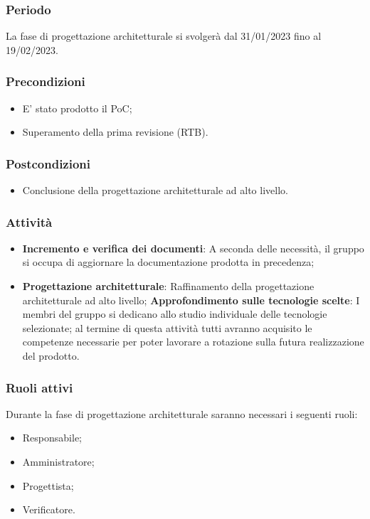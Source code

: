 \subsubsection{Periodo}
La fase di progettazione architetturale si svolgerà dal 31/01/2023 fino al 19/02/2023.

\subsubsection{Precondizioni}
\begin{itemize}
    \item E’ stato prodotto il PoC;
    \item Superamento della prima revisione (RTB).
\end{itemize}

\subsubsection{Postcondizioni}
\begin{itemize}
    \item Conclusione della progettazione architetturale ad alto livello.
\end{itemize}

\subsubsection{Attività}
\begin{itemize}
    \item \textbf{Incremento e verifica dei documenti}: A seconda delle necessità, il gruppo si occupa di aggiornare la documentazione prodotta in precedenza;
    \item \textbf{Progettazione architetturale}: Raffinamento della progettazione architetturale ad alto livello;
        \subitem \textbf{Approfondimento sulle tecnologie scelte}: I membri del gruppo si dedicano allo studio individuale delle tecnologie selezionate; al termine di questa attività tutti avranno acquisito le competenze necessarie per poter lavorare a rotazione sulla futura realizzazione del prodotto.
\end{itemize}

\subsubsection{Ruoli attivi}
Durante la fase di progettazione architetturale saranno necessari i seguenti ruoli:
\begin{itemize}
	\item Responsabile;
    \item Amministratore;
    \item Progettista;
    \item Verificatore.
\end{itemize}

